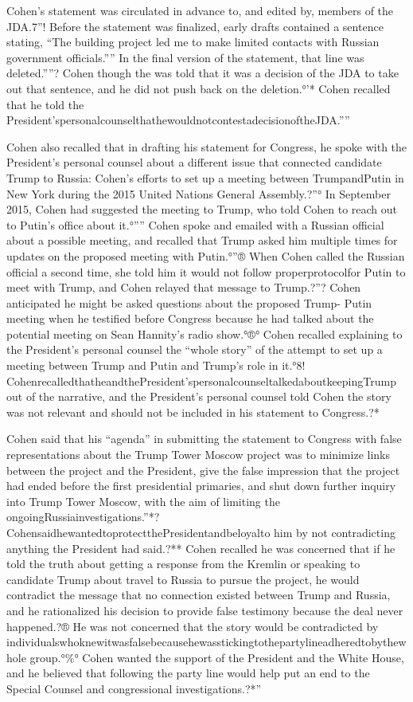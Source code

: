 Cohen's statement was circulated in advance to, and edited by, members of the JDA.7”! Before the statement was finalized, early drafts contained a sentence stating, “The building project led me to make limited contacts with Russian government officials.”” In the final version of the statement, that line was deleted.””? Cohen though the was told that it was a decision of the JDA to take out that sentence, and he did not push back on the deletion.°'* Cohen recalled that he told the President'spersonalcounselthathewouldnotcontestadecisionoftheJDA.””

Cohen also recalled that in drafting his statement for Congress, he spoke with the President's personal counsel about a different issue that connected candidate Trump to Russia: Cohen's efforts to set up a meeting between TrumpandPutin in New York during the 2015 United Nations General Assembly.?”° In September 2015, Cohen had suggested the meeting to Trump, who told Cohen to reach out to Putin's office about it.°”” Cohen spoke and emailed with a Russian official about a possible meeting, and recalled that Trump asked him multiple times for updates on the proposed meeting with Putin.°”® When Cohen called the Russian official a second time, she told him it would not follow properprotocolfor Putin to meet with Trump, and Cohen relayed that message to Trump.?”? Cohen anticipated he might be asked questions about the proposed Trump- Putin meeting when he testified before Congress because he had talked about the potential meeting on Sean Hannity's radio show.°®° Cohen recalled explaining to the President's personal counsel the “whole story” of the attempt to set up a meeting between Trump and Putin and Trump's role in it.°8! CohenrecalledthatheandthePresident'spersonalcounseltalkedaboutkeepingTrump out of the narrative, and the President's personal counsel told Cohen the story was not relevant and should not be included in his statement to Congress.?*

Cohen said that his “agenda” in submitting the statement to Congress with false representations about the Trump Tower Moscow project was to minimize links between the project and the President, give the false impression that the project had ended before the first presidential primaries, and shut down further inquiry into Trump Tower Moscow, with the aim of limiting the ongoingRussiainvestigations.”*? CohensaidhewantedtoprotectthePresidentandbeloyalto him by not contradicting anything the President had said.?** Cohen recalled he was concerned that if he told the truth about getting a response from the Kremlin or speaking to candidate Trump about travel to Russia to pursue the project, he would contradict the message that no connection existed between Trump and Russia, and he rationalized his decision to provide false testimony because the deal never happened.?® He was not concerned that the story would be contradicted by individualswhoknewitwasfalsebecausehewasstickingtothepartylineadheredtobythewhole group.°\%° Cohen wanted the support of the President and the White House, and he believed that following the party line would help put an end to the Special Counsel and congressional investigations.?*”

